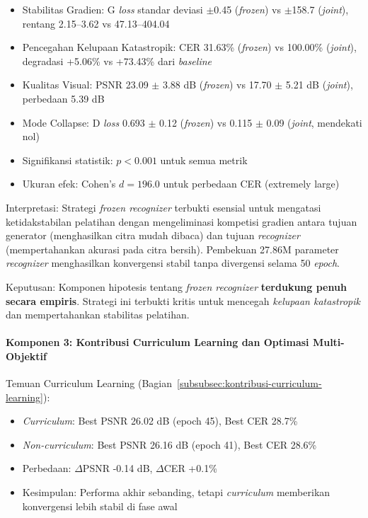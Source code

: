 \documentclass[12pt,a4paper]{article}
\begin{document}
\begin{itemize}[nosep]
    \item Stabilitas Gradien: G \textit{loss} standar deviasi $\pm$0.45 (\textit{frozen}) vs $\pm$158.7 (\textit{joint}), rentang 2.15--3.62 vs 47.13--404.04
    \item Pencegahan Kelupaan Katastropik: CER 31.63\% (\textit{frozen}) vs 100.00\% (\textit{joint}), degradasi +5.06\% vs +73.43\% dari \textit{baseline}
    \item Kualitas Visual: PSNR 23.09 $\pm$ 3.88 dB (\textit{frozen}) vs 17.70 $\pm$ 5.21 dB (\textit{joint}), perbedaan 5.39 dB
    \item Mode Collapse: D \textit{loss} 0.693 $\pm$ 0.12 (\textit{frozen}) vs 0.115 $\pm$ 0.09 (\textit{joint}, mendekati nol)
    \item Signifikansi statistik: $p < 0.001$ untuk semua metrik
    \item Ukuran efek: Cohen's $d = 196.0$ untuk perbedaan CER (extremely large)
\end{itemize}

Interpretasi: Strategi \textit{frozen recognizer} terbukti esensial untuk mengatasi ketidakstabilan pelatihan dengan mengeliminasi kompetisi gradien antara tujuan generator (menghasilkan citra mudah dibaca) dan tujuan \textit{recognizer} (mempertahankan akurasi pada citra bersih). Pembekuan 27.86M parameter \textit{recognizer} menghasilkan konvergensi stabil tanpa divergensi selama 50 \textit{epoch}.

Keputusan: Komponen hipotesis tentang \textit{frozen recognizer} \textbf{terdukung penuh secara empiris}. Strategi ini terbukti kritis untuk mencegah \textit{kelupaan katastropik} dan mempertahankan stabilitas pelatihan.

\vspace{0.5em}

\paragraph{Komponen 3: Kontribusi Curriculum Learning dan Optimasi Multi-Objektif}

Temuan Curriculum Learning (Bagian~\ref{subsubsec:kontribusi-curriculum-learning}):

\begin{itemize}[nosep]
    \item \textit{Curriculum}: Best PSNR 26.02 dB (epoch 45), Best CER 28.7\%
    \item \textit{Non-curriculum}: Best PSNR 26.16 dB (epoch 41), Best CER 28.6\%
    \item Perbedaan: $\Delta$PSNR -0.14 dB, $\Delta$CER +0.1\%
    \item Kesimpulan: Performa akhir sebanding, tetapi \textit{curriculum} memberikan konvergensi lebih stabil di fase awal
\end{itemize}
\end{document}
